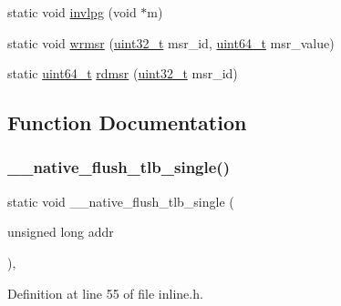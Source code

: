 \begin{DoxyCompactItemize}
static void \hyperlink{a00113_a20faed26baa341152aa32288418f1457_a20faed26baa341152aa32288418f1457}{invlpg} (void $\ast$m)
\item 
static void \hyperlink{a00113_a368f08346121290f513a26011e0f68f8_a368f08346121290f513a26011e0f68f8}{wrmsr} (\hyperlink{a00104_a435d1572bf3f880d55459d9805097f62_a435d1572bf3f880d55459d9805097f62}{uint32\+\_\+t} msr\+\_\+id, \hyperlink{a00104_aa232ecf786a74ce5363c36c10798d2b1_aa232ecf786a74ce5363c36c10798d2b1}{uint64\+\_\+t} msr\+\_\+value)
\item 
static \hyperlink{a00104_aa232ecf786a74ce5363c36c10798d2b1_aa232ecf786a74ce5363c36c10798d2b1}{uint64\+\_\+t} \hyperlink{a00113_a6fa28502e33e305c4335fe3032dc7799_a6fa28502e33e305c4335fe3032dc7799}{rdmsr} (\hyperlink{a00104_a435d1572bf3f880d55459d9805097f62_a435d1572bf3f880d55459d9805097f62}{uint32\+\_\+t} msr\+\_\+id)
\end{DoxyCompactItemize}


\subsection{Function Documentation}
\mbox{\label{a00113_ad80d786594a109b21e30da4bf6f56a85_ad80d786594a109b21e30da4bf6f56a85}} 
\subsubsection{\texorpdfstring{\+\_\+\+\_\+native\+\_\+flush\+\_\+tlb\+\_\+single()}{\_\_native\_flush\_tlb\_single()}}
{\footnotesize\ttfamily static void \+\_\+\+\_\+native\+\_\+flush\+\_\+tlb\+\_\+single (\begin{DoxyParamCaption}\item[{unsigned long}]{addr }\end{DoxyParamCaption})\hspace{0.3cm}{\ttfamily [inline]}, {\ttfamily [static]}}



Definition at line 55 of file inline.\+h.


\mbox{\label{a00113_ae7df27a6150c6a020eead928af349b21_ae7df27a6150c6a020eead928af349b21}} 
